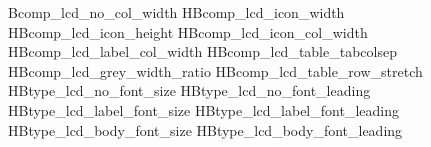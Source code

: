 
\expandafter\providecommand\csname HBcomp_lcd_no_col_width\endcsname{5.2mm}
\expandafter\providecommand\csname HBcomp_lcd_icon_width\endcsname{8mm}
\expandafter\providecommand\csname HBcomp_lcd_icon_height\endcsname{8mm}
\expandafter\providecommand\csname HBcomp_lcd_icon_col_width\endcsname{11mm}
\expandafter\providecommand\csname HBcomp_lcd_label_col_width
\expandafter\providecommand\csname HBcomp_lcd_table_tabcolsep\endcsname{2.0pt}
\expandafter\providecommand\csname HBcomp_lcd_grey_width_ratio
\expandafter\providecommand\csname HBcomp_lcd_table_row_stretch
\expandafter\providecommand\csname HBtype_lcd_no_font_size\endcsname{5.8pt}
\expandafter\providecommand\csname HBtype_lcd_no_font_leading\endcsname{6.4pt}
\expandafter\providecommand\csname HBtype_lcd_label_font_size\endcsname{6.2pt}
\expandafter\providecommand\csname HBtype_lcd_label_font_leading\endcsname{6.8pt}
\expandafter\providecommand\csname HBtype_lcd_body_font_size\endcsname{6.0pt}
\expandafter\providecommand\csname HBtype_lcd_body_font_leading\endcsname{6.8pt}

\providecommand{\HBCircledNum}[1]{%
  \begin{tikzpicture}[baseline=(n.base)]
    \node[draw=\csname HBtype_body_color\endcsname, circle, inner sep=0.28mm,
          line width=0.28pt,
          font=\HBFontRegular\fontsize{\csname HBtype_lcd_no_font_size\endcsname}
                {\csname HBtype_lcd_no_font_leading\endcsname}\selectfont,
          text=\csname HBtype_body_color\endcsname] (n) {#1};
  \end{tikzpicture}%
}

\providecommand{\HBTypeLcdNo}[1]{%
  {\centering\HBCircledNum{#1}\par}%
}

\providecommand{\HBTypeLcdLabel}[1]{%
  {\leftskip=\csname HBcomp_table_text_indent\endcsname\relax
   \HBFontSemiBold
   \color{\csname HBtype_body_color\endcsname}%
   \fontsize{\csname HBtype_lcd_label_font_size\endcsname}
            {\csname HBtype_lcd_label_font_leading\endcsname}\selectfont
   \RaggedRight #1}%
}

